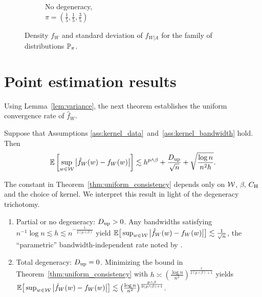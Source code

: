\begin{figure}[ht]
\begin{subfigure}{0.32\textwidth}
    \caption{
      No degeneracy, \\
      $\pi = \left( \frac{1}{5}, \frac{1}{5}, \frac{3}{5} \right)$
    }
  \end{subfigure}
  \caption{
    Density $f_W$ and standard deviation
    of $f_{W|A}$ for the family of distributions $\P_\pi$.\\
  }
  \label{fig:distribution}
\end{figure}

\section{Point estimation results}\label{sec:point_estimation}

Using Lemma~\ref{lem:variance},
the next theorem establishes the uniform
convergence rate of $\hat{f}_W$.
%
\begin{theorem}%
  \label{thm:uniform_consistency}%
  Suppose that Assumptions
  \ref{ass:kernel_data}~and~\ref{ass:kernel_bandwidth}
  hold. Then
  \begin{align*}
    \E\left[
      \sup_{w \in \cW}
      \big|\hat{f}_W(w) - f_W(w)\big|
    \right]
    \lesssim
    h^{p\wedge\beta}
    + \frac{\Du}{\sqrt n}
    + \sqrt{\frac{\log n}{n^2h}}.
  \end{align*}
\end{theorem}
%
The constant in Theorem~\ref{thm:uniform_consistency}
depends only on $\cW$, $\beta$, $\CH$
and the choice of kernel.
We interpret this result in light of the degeneracy trichotomy.
\begin{enumerate}[label=(\roman*)]\onehalfspacing
  \item Partial or no degeneracy:
    $\Du > 0$.
    Any bandwidths satisfying
    $n^{-1} \log n \lesssim h \lesssim n^{-\frac{1}{2(p\wedge\beta)}}$
    yield
    $\E\big[\sup_{w \in \cW}\big|\hat f_W(w)
    - f_W(w)\big| \big] \lesssim \frac{1}{\sqrt n}$,
    the ``parametric'' bandwidth-independent rate noted by
    \citet{graham2022kernel}.

  \item Total degeneracy:
    $\Du = 0$.
    Minimizing the bound in
    Theorem~\ref{thm:uniform_consistency} with
    $h \asymp \left( \frac{\log n}{n^2} \right)^{\frac{1}{2(p\wedge\beta)+1}}$
    yields
    $\E\big[ \sup_{w \in \cW} \big|\hat f_W(w) - f_W(w)\big| \big]
    \lesssim
    \big(\frac{\log n}{n^2} \big)^{\frac{p\wedge\beta}{2(p\wedge\beta)+1}}$.
\end{enumerate}

